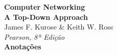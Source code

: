 \documentclass[12pt]{article}
\begin{document}
\pagestyle{empty}

\begin{titlepage}
    \begin{center}
        {\Huge\bfseries\color{kuroseBlue}Computer Networking}\\
        \vspace{0.4cm}
        {\Large\textbf{\color{kuroseGray}A Top-Down Approach}}\\
        \vspace{0.2cm}
        {\large\color{kuroseBlue}James F. Kurose \& Keith W. Ross}\\
        {\color{kuroseGray}\textit{Pearson, 8ª Edição}}\\
        \vspace{1cm}
        {\large\textbf{Anotações}}\\
        \vfill
    \end{center}
    \tableofcontents
    \thispagestyle{empty}
\end{titlepage}


\end{document}
